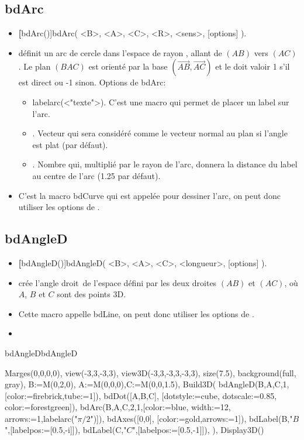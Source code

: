 \subsection{bdArc}

\begin{itemize}
 \item \util \textbf[bdArc()]{bdArc( <B>, <A>, <C>, <R>, <sens>, [options] )}.
 \item \desc définit un arc de cercle dans l'espace de rayon , allant de $(AB)$ vers $(AC)$. Le plan $(BAC)$ est orienté par la base $(\vec{AB},\vec{AC})$ et le  doit valoir 1 s'il est direct ou -1 sinon. Options de bdArc:

  \begin{itemize}
  \item \textcolor{\coloropt}{labelarc(<"texte">)}. C'est une macro qui permet de placer un label sur l'arc.  \item {}. Vecteur qui sera considéré comme le vecteur normal au plan si l'angle est plat (\Nil par défaut).
  \item {}. Nombre qui, multiplié par le rayon de l'arc, donnera la distance du label au centre de l'arc (1.25 par défaut).
  \end{itemize}
 \item C'est la macro bdCurve qui est appelée pour dessiner l'arc, on peut donc utiliser les options de .
\end{itemize}

\subsection{bdAngleD}

\begin{itemize}
 \item \util \textbf[bdAngleD()]{bdAngleD( <B>, <A>, <C>, <longueur>, [options] )}.
 \item \desc crée \og l'angle droit\fg\ de l'espace défini par les deux droites $(AB)$ et $(AC)$, où $A$, $B$ et $C$ sont des points 3D.
 \item Cette macro appelle bdLine, on peut donc utiliser les options de .
 \item \exem
\end{itemize}

\begin{demo}{bdAngleD}{bdAngleD}
\begin{texgraph}[name=bdAngleD]
Marges(0,0,0,0), view(-3,3,-3,3),
view3D(-3,3,-3,3,-3,3), size(7.5),
background(full, gray),
B:=M(0,2,0), A:=M(0,0,0),C:=M(0,0,1.5),
Build3D(
 bdAngleD(B,A,C,1, [color:=firebrick,tube:=1]),
 bdDot([A,B,C], [dotstyle:=cube,
         dotscale:=0.85,
         color:=forestgreen]),
 bdArc(B,A,C,2,1,[color:=blue, width:=12,
         arrows:=1,labelarc("$\pi/2$")]),
 bdAxes([0,0], [color:=gold,arrows:=1]),
 bdLabel(B,"$B$",[labelpos:=[0.5,-i]]),
 bdLabel(C,"$C$",[labelpos:=[0.5,-1]]),
    ),
Display3D()
\end{texgraph}
\end{demo}


